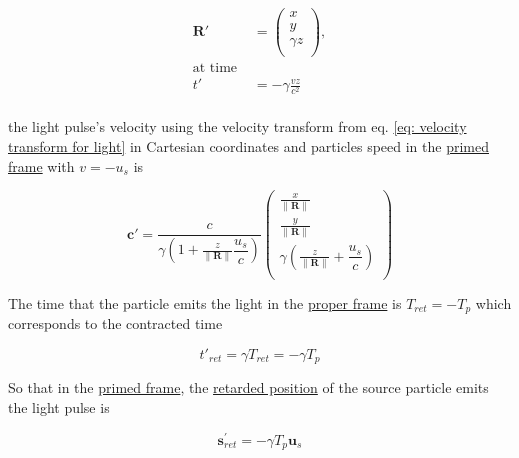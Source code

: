 \begin{equation}
	\label{eq: displacement transform}
	\begin{aligned}
		\mathbf{R}{'} & =
		\begin{pmatrix}
			x          \\
			y          \\
			{\gamma} z \\
		\end{pmatrix},                                  \\
		\text{at time \ \ \ }                           \\
		{t{'}}        & =-{\gamma} \frac{{v}{z}}{{c}^2} \\
	\end{aligned}
\end{equation}

the light pulse's velocity using the velocity transform from eq.
\eqref{eq: velocity transform for light} in Cartesian coordinates and particles speed in the \hyperlink{def-Primed-Frame}{primed frame} with ${v} =-{u_s}$ is

\begin{equation}
	\label{eq: light pulse velocity transform}
	\mathbf{c}{'} = \dfrac{c}{{\gamma}\left(1 + \frac{z}{\|\mathbf{R}\|} \dfrac{u_s}{c} \right)}
	\begin{pmatrix}
		\frac{x}{\|\mathbf{R}\|}                                          \\
		\frac{y}{\|\mathbf{R}\|}                                          \\
		{\gamma} \left( \frac{z}{\|\mathbf{R}\|} + \dfrac{u_s}{c} \right) \\
	\end{pmatrix}
\end{equation}


The time that the particle emits the light in the \hyperlink{def-proper-frame}{proper frame} is ${T}_{ret} =-{T}_{p}$ which corresponds to the contracted time

\begin{equation}
	t{'}_{ret} = {\gamma} {T}_{ret} =-{\gamma} {T}_{p}
\end{equation}

So that in the \hyperlink{def-Primed-Frame}{primed frame}, the \hyperlink{def-retarded-position}{retarded position} of the source particle emits the light pulse is

\begin{equation}
	\mathbf{s}_{ret}^{'} =-{\gamma} {T}_{p} \mathbf{u}_s
\end{equation}

